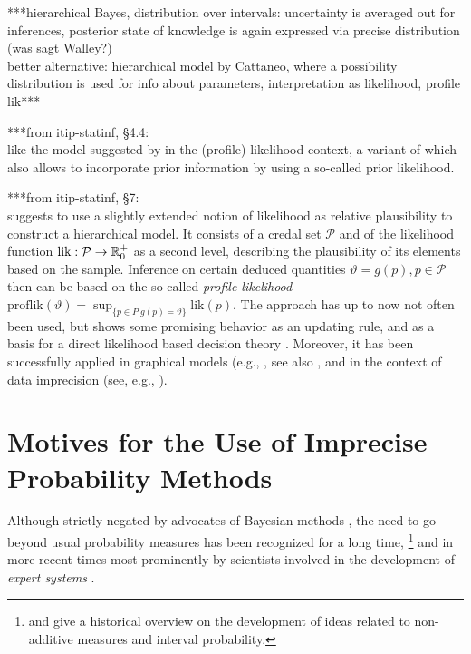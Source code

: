 ***hierarchical Bayes, distribution over intervals:
uncertainty is averaged out for inferences,
posterior state of knowledge is again expressed via precise distribution (was sagt Walley?)\\
better alternative: hierarchical model by Cattaneo,
where a possibility distribution is used for info about parameters,
interpretation as likelihood, profile lik***

***from itip-statinf, \S 4.4:\\
like the model suggested by \textcite{2008:cattaneo} in the (profile) likelihood context,
a variant of which also allows to incorporate prior information by using a so-called prior likelihood.

***from itip-statinf, \S 7:\\
\textcite{2008:cattaneo} suggests to use a slightly extended notion of likelihood as relative plausibility to construct a hierarchical model.
It consists of a credal set $\mathcal{P}$ and of the likelihood function $\text{lik}: {\cal P} \to \mathbb{R}_0^+$ as a second level,
describing the plausibility of its elements based on the sample.
Inference on certain deduced quantities $\vartheta=g\left(p\right), p \in \mathcal{P}$
then can be based on the so-called \emph{profile likelihood}
$\text{proflik} \left(\vartheta\right) = \sup_{\{p \in P \vert g\left(p\right)=\vartheta\}} \text{lik}\left(p\right)$.
The approach has up to now not often been used, but shows some promising behavior as an updating rule,
and as a basis for a direct likelihood based decision theory \parencite{2007a:cattaneo, 2012:cattaneo-technicalRep}.
Moreover, it has been successfully applied in graphical models (e.g., \cite{2011:4:isipta},
see also \cite[\S 4.3]{itip-classification}, and in the context of data imprecision
(see, e.g., \cite[\S 8.1]{itip-statinf}).


\section{Motives for the Use of Imprecise Probability Methods}
\label{sec:motivation}

Although strictly negated by advocates of Bayesian methods \parencite[e.g., by][]{1987:lindley},
the need to go beyond usual probability measures has been recognized for a long time,%
\footnote{\textcite{2009:hampel} and \textcite[\S 1]{2001:weichselberger} give a historical overview on the development of
ideas related to non-additive measures and interval probability.}
and in more recent times most prominently by scientists involved in the development of \emph{expert systems}
\parencite[see, e.g.,][]{1996:walley::expert}.%

